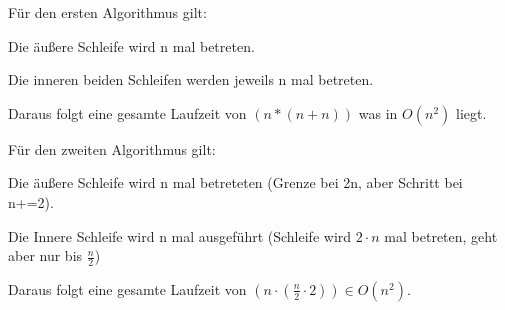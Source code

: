 Für den ersten Algorithmus gilt:

Die äußere Schleife wird n mal betreten.

Die inneren beiden Schleifen werden jeweils n mal betreten.

Daraus folgt eine gesamte Laufzeit von $(n*(n+n))$ was in $O(n^2)$ liegt.



Für den zweiten Algorithmus gilt:

Die äußere Schleife wird n mal betreteten (Grenze bei 2n, aber Schritt bei n+=2).

Die Innere Schleife wird n mal ausgeführt (Schleife wird $2 \cdot n$ mal betreten, geht aber nur bis $ \frac{n}{2} $)

Daraus folgt eine gesamte Laufzeit von $(n \cdot (\frac{n}{2} \cdot 2) ) \in O(n^2)$.


